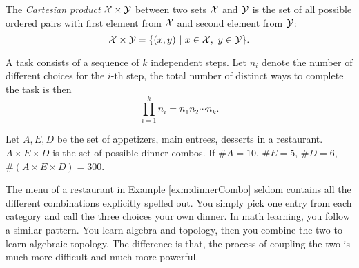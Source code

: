 \begin{defn}
  The \emph{Cartesian product} ${\cal X}\times {\cal Y}$
   between two sets ${\cal X}$ and ${\cal Y}$
   is the set of all possible ordered pairs with first element
   from ${\cal X}$ and second element from ${\cal Y}$:
   \begin{equation}
     {\cal X}\times {\cal Y} = \{(x,y)\ |\ x\in {\cal X},\ y\in {\cal Y}\}.
   \end{equation}
\end{defn}

\begin{axm}
  \label{axm:multiplicationPrinciple}
  A task consists of a sequence of $k$ independent steps.
  Let $n_i$ denote the number of different choices for the $i$-th step,
   the total number of distinct ways to complete the task
   is then
   \begin{equation}
     \prod_{i=1}^{k} n_i = n_1n_2\cdots n_k.
   \end{equation}
 \end{axm}

 \begin{exm}
   \label{exm:dinnerCombo}
   Let $A, E, D$ be the set of appetizers,
    main entrees, desserts in a restaurant.
   $A\times E\times D$
    is the set of possible dinner combos.
   If $\#A=10$, $\#E=5$, $\#D=6$,
    $\#(A\times E\times D)=300$.
 \end{exm}

 \begin{rem}
   The menu of a restaurant in Example \ref{exm:dinnerCombo}
    seldom contains all the different combinations
    explicitly spelled out.
   You simply pick one entry from each category
    and call the three choices your own dinner.
   In math learning,
    you follow a similar pattern.
   You learn algebra and topology,
    then you combine the two to learn algebraic topology.
   The difference is that,
    the process of coupling the two is much more difficult
    and much more powerful.
 \end{rem}



